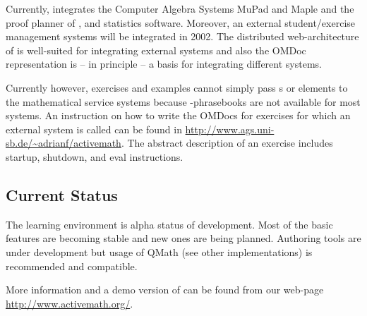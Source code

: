 Currently, {\activemath} integrates the Computer Algebra Systems MuPad and Maple
and the proof planner of {\OMEGA}, and statistics software. Moreover, an external
student/exercise management systems will be integrated in 2002.  The distributed
web-architecture of {\activemath} is well-suited for integrating external systems
and also the OMDoc representation is -- in principle -- a basis for integrating
different systems.

Currently however, exercises and examples cannot simply pass {\omdoc}s or
{\openmath} elements to the mathematical service systems because
{\openmath}-phrasebooks are not available for most systems.  An instruction on how
to write the OMDocs for exercises for which an external system is called can be
found in {\url{http://www.ags.uni-sb.de/~adrianf/activemath}}. The abstract
description of an exercise includes startup, shutdown, and eval instructions.

\subsection{Current Status}

The {\activemath} learning environment is alpha status of development.  Most of
the basic features are becoming stable and new ones are being planned.  Authoring
tools are under development but usage of QMath (see other implementations) is
recommended and compatible.

More information and a demo version of {\activemath} can be found from our
web-page {\url{http://www.activemath.org/}}.
